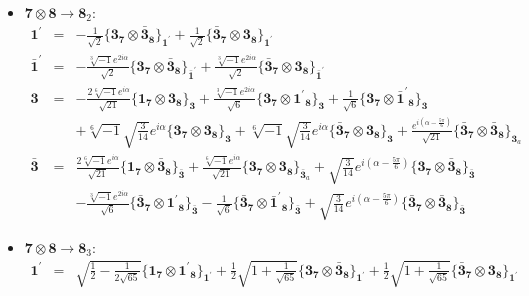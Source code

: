 \documentclass[english]{article}
\newcommand{\subcg}[3]{\big\{ {#1}\otimes{#2}\big\}^{}_{#3}}
\newcommand{\rep}[1]{\mathbf{#1}}
\begin{document}
\begin{itemize}
\item $\rep{7}\otimes\rep{8}\to\rep{8}_{2}$:
\begin{eqnarray*}
\rep{1^{\prime}} &=& -\frac{1}{\sqrt{2}}\subcg{\rep{3}_{\rep{7}}}{\rep{\bar{3}}_{\rep{8}}}{\rep{1^{\prime}}}+\frac{1}{\sqrt{2}}\subcg{\rep{\bar{3}}_{\rep{7}}}{\rep{3}_{\rep{8}}}{\rep{1^{\prime}}}
\\
\rep{\bar{1}^{\prime}} &=& -\frac{\sqrt[3]{-1} e^{2 i \alpha }}{\sqrt{2}}\subcg{\rep{3}_{\rep{7}}}{\rep{\bar{3}}_{\rep{8}}}{\rep{\bar{1}^{\prime}}}+\frac{\sqrt[3]{-1} e^{2 i \alpha }}{\sqrt{2}}\subcg{\rep{\bar{3}}_{\rep{7}}}{\rep{3}_{\rep{8}}}{\rep{\bar{1}^{\prime}}}
\\
\rep{3} &=& -\frac{2 \sqrt[6]{-1} e^{i \alpha }}{\sqrt{21}}\subcg{\rep{1}_{\rep{7}}}{\rep{3}_{\rep{8}}}{\rep{3}}+\frac{\sqrt[3]{-1} e^{2 i \alpha }}{\sqrt{6}}\subcg{\rep{3}_{\rep{7}}}{\rep{1^{\prime}}_{\rep{8}}}{\rep{3}}+\frac{1}{\sqrt{6}}\subcg{\rep{3}_{\rep{7}}}{\rep{\bar{1}^{\prime}}_{\rep{8}}}{\rep{3}} \\ 
 & & +\sqrt[6]{-1} \sqrt{\frac{3}{14}} e^{i \alpha }\subcg{\rep{3}_{\rep{7}}}{\rep{3}_{\rep{8}}}{\rep{3}}+\sqrt[6]{-1} \sqrt{\frac{3}{14}} e^{i \alpha }\subcg{\rep{\bar{3}}_{\rep{7}}}{\rep{3}_{\rep{8}}}{\rep{3}}+\frac{e^{i \left(\alpha -\frac{5 \pi }{6}\right)}}{\sqrt{21}}\subcg{\rep{\bar{3}}_{\rep{7}}}{\rep{\bar{3}}_{\rep{8}}}{\rep{3}_{a}}
\\
\rep{\bar{3}} &=& \frac{2 \sqrt[6]{-1} e^{i \alpha }}{\sqrt{21}}\subcg{\rep{1}_{\rep{7}}}{\rep{\bar{3}}_{\rep{8}}}{\rep{\bar{3}}}+\frac{\sqrt[6]{-1} e^{i \alpha }}{\sqrt{21}}\subcg{\rep{3}_{\rep{7}}}{\rep{3}_{\rep{8}}}{\rep{\bar{3}}_{a}}+\sqrt{\frac{3}{14}} e^{i \left(\alpha -\frac{5 \pi }{6}\right)}\subcg{\rep{3}_{\rep{7}}}{\rep{\bar{3}}_{\rep{8}}}{\rep{\bar{3}}} \\ 
 & & -\frac{\sqrt[3]{-1} e^{2 i \alpha }}{\sqrt{6}}\subcg{\rep{\bar{3}}_{\rep{7}}}{\rep{1^{\prime}}_{\rep{8}}}{\rep{\bar{3}}}-\frac{1}{\sqrt{6}}\subcg{\rep{\bar{3}}_{\rep{7}}}{\rep{\bar{1}^{\prime}}_{\rep{8}}}{\rep{\bar{3}}}+\sqrt{\frac{3}{14}} e^{i \left(\alpha -\frac{5 \pi }{6}\right)}\subcg{\rep{\bar{3}}_{\rep{7}}}{\rep{\bar{3}}_{\rep{8}}}{\rep{\bar{3}}}
\end{eqnarray*}
\item $\rep{7}\otimes\rep{8}\to\rep{8}_{3}$:
\begin{eqnarray*}
\rep{1^{\prime}} &=& \sqrt{\frac{1}{2}-\frac{1}{2 \sqrt{65}}}\subcg{\rep{1}_{\rep{7}}}{\rep{1^{\prime}}_{\rep{8}}}{\rep{1^{\prime}}}+\frac{1}{2} \sqrt{1+\frac{1}{\sqrt{65}}}\subcg{\rep{3}_{\rep{7}}}{\rep{\bar{3}}_{\rep{8}}}{\rep{1^{\prime}}}+\frac{1}{2} \sqrt{1+\frac{1}{\sqrt{65}}}\subcg{\rep{\bar{3}}_{\rep{7}}}{\rep{3}_{\rep{8}}}{\rep{1^{\prime}}}

\end{eqnarray*}
\end{itemize}
\end{document}
